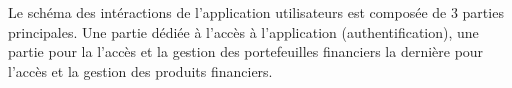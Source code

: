 \documentclass{article}
\begin{document}
Le schéma des intéractions de l'application utilisateurs est composée de 3 parties principales. Une partie dédiée à l'accès à l'application (authentification), une partie pour la l'accès et la gestion des portefeuilles financiers la dernière pour l'accès et la gestion des produits financiers.\\
\end{document}
